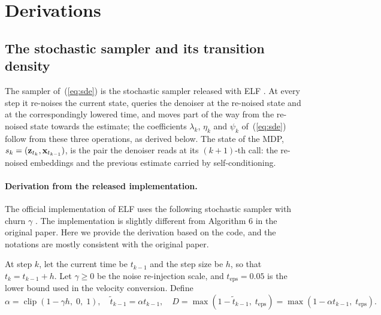 \section{Derivations}
\label{app:derivations}

\subsection{The stochastic sampler and its transition density}
\label{app:kernels}
The sampler of~(\ref{eq:sde}) is the stochastic sampler released with ELF \citep{hu2026elf}. At every step it re-noises the current state, queries the denoiser at the re-noised state and at the correspondingly lowered time, and moves part of the way from the re-noised state towards the estimate; the coefficients $\lambda_k$, $\eta_k$ and $\psi_k$ of~(\ref{eq:sde}) follow from these three operations, as derived below. The state of the MDP, $s_k=({\mathbf{z}}_{t_k},{\mathbf{x}}_{t_{k-1}})$, is the pair the denoiser reads at its $(k{+}1)$-th call: the re-noised embeddings and the previous estimate carried by self-conditioning.

\paragraph{Derivation from the released implementation.}
The official implementation of ELF uses the following stochastic sampler with churn $\gamma$
\citep{hu2026elf}. The implementation is slightly different from Algorithm 6 in the original
paper. Here we provide the derivation based on the code, and the notations are
mostly consistent with the original paper.

At step $k$, let the current time be $t_{k-1}$ and the step size be $h$, so that
$t_{k} = t_{k-1} + h$. Let $\gamma \ge 0$ be the noise re-injection scale, and
$t_{\text{eps}}=0.05$ is the lower bound used in the velocity conversion.
Define
\begin{equation}
  \alpha = \operatorname{clip}\!\left(1 - \gamma h,\; 0,\; 1\right),
  \quad
  \tilde{t}_{k-1} = \alpha t_{k-1},
  \quad
  D = \max\!\left(1 - \tilde{t}_{k-1},\; t_{\text{eps}}\right)
    = \max\!\left(1 - \alpha t_{k-1},\; t_{\text{eps}}\right).
\end{equation}

